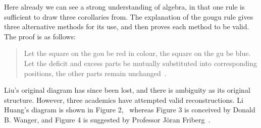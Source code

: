 \documentclass[12pt]{article}
\begin{document}
Here already we can see a strong understanding
of algebra, in that one rule is sufficient to draw
three corollaries from. The explanation of the
gougu rule gives three alternative methods for its
use, and then proves each method to be valid. The
proof is as follows:
\begin{quote}
  Let the square on the gou be red in colour, the
  square on the gu be blue. Let the deficit and
  excess parts be mutually substituted into
  corresponding positions, the other parts remain
  unchanged~\cite{Shen}.
\end{quote}

Liu’s original diagram has since been lost, and
there is ambiguity as its original structure.
However, three academics have attempted valid
reconstructions. Li Huang’s diagram is shown in
Figure 2,~\cite{Shen} whereas Figure 3 is conceived
by Donald B. Wanger, and Figure 4 is suggested by
Professor Jöran Friberg~\cite{Wagner}.














\end{document}
